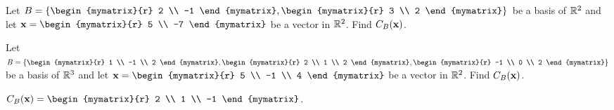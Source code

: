 \begin{ex}
  Let $B = \set{\begin{mymatrix}{r}
      2 \\
      -1
    \end{mymatrix}, \begin{mymatrix}{r}
      3 \\
      2
    \end{mymatrix} }$ be a basis of $\mathbb{R}^2$ and let $\vect{x} = \begin{mymatrix}{r}
    5 \\
    -7
  \end{mymatrix}$ be a vector in $\mathbb{R}^2$. Find $C_B(\mbox{\bf x})$.
\end{ex}

\begin{ex}
  Let $B = \set{\begin{mymatrix}{r}
      1 \\
      -1 \\
      2
    \end{mymatrix}, \begin{mymatrix}{r}
      2 \\
      1 \\
      2
    \end{mymatrix}, \begin{mymatrix}{r}
      -1 \\
      0 \\
      2
    \end{mymatrix} }$
  be a basis of $\mathbb{R}^3$ and let $\vect{x} = \begin{mymatrix}{r}
    5 \\
    -1 \\
    4
  \end{mymatrix}$ be a vector in $\mathbb{R}^2$. Find $C_B(\mbox{\bf x})$.
  \begin{sol}
    $C_B(\vect{x}) =
    \begin{mymatrix}{r}
      2 \\
      1 \\
      -1
    \end{mymatrix}$.
  \end{sol}
\end{ex}

